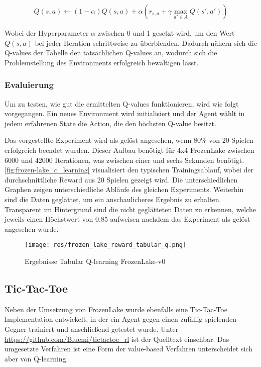 \documentclass[11pt]{scrartcl}
\begin{document}
\begin{align}
  Q(s, a) \leftarrow (1 - \alpha)Q(s, a) +
  \alpha(r_{s, a} + \gamma \max_{a'\in A}Q(s', a'))
\label{aln:QValueAdapt}
\end{align}
\noindent

Wobei der Hyperparameter $\alpha$ zwischen 0 und 1 gesetzt wird, um den Wert $Q(s, a)$ bei
jeder Iteration schrittweise zu überblenden. Dadurch nähern sich die Q-values der Tabelle
den tatsächlichen Q-values an, wodurch sich die Problemstellung des Environments erfolgreich 
bewältigen lässt.

\subsubsection{Evaluierung}
Um zu testen, wie gut die ermittelten Q-values funktionieren, wird wie folgt vorgegangen.
Ein neues Environment wird initialisiert und der Agent wählt in jedem erfahrenen State die
Action, die den höchsten Q-value besitzt.

Das vorgestellte Experiment wird als gelöst angesehen, wenn 80\% von 20 Spielen erfolgreich
beendet wurden. Dieser Aufbau benötigt für 4x4 FrozenLake zwischen 6000 und 42000
Iterationen, was zwischen einer und sechs Sekunden benötigt.
\autoref{fig:frozen-lake_q_learning} visualisiert den typischen Trainingsablauf, wobei der
durchschnittliche Reward aus 20 Spielen gezeigt wird. Die unterschiedlichen Graphen zeigen
unterschiedliche Abläufe des gleichen Experiments. Weiterhin sind die Daten geglättet, um
ein anschaulicheres Ergebnis zu erhalten. Transparent im Hintergrund sind die nicht
geglätteten Daten zu erkennen, welche jeweils einen Höchstwert von 0.85 aufweisen nachdem
das Experiment als gelöst angesehen wurde.
\begin{figure}[htp]
\centering
\texttt{[image: res/frozen\_lake\_reward\_tabular\_q.png]}
\caption{Ergebnisse Tabular Q-learning FrozenLake-v0}
\label{fig:frozen-lake_q_learning}
\end{figure}

\subsection{Tic-Tac-Toe}
Neben der Umsetzung von FrozenLake wurde ebenfalls eine Tic-Tac-Toe Implementation
entwickelt, in der ein Agent gegen einen zufällig spielenden Gegner trainiert und
anschließend getestet wurde. Unter \url{https://github.com/Bluemi/tictactoe_rl} ist
der Quelltext einsehbar. Das umgesetzte Verfahren ist eine Form der value-based
Verfahren unterscheidet sich aber von Q-learning.
\end{document}
